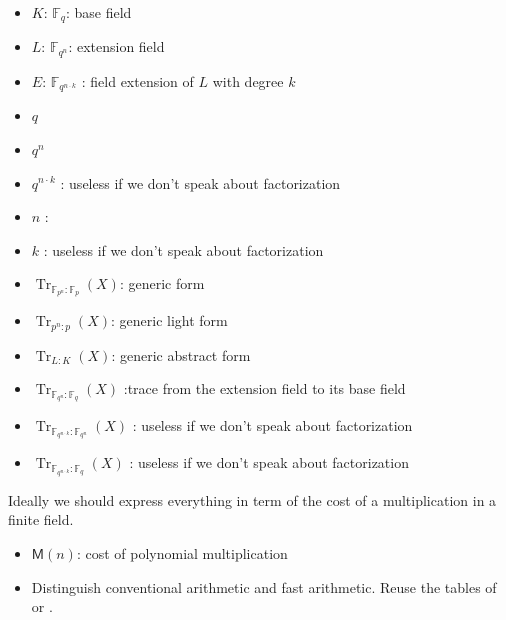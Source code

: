 \documentclass{sig-alternate}
\newcommand{\ff}[1]{\mathbb{F}_{#1}}
\newcommand{\qq}{q}
\newcommand{\nn}{n}
\newcommand{\qn}{{\qq^\nn}}
\newcommand{\extfactfdegree}{k}
\newcommand{\extfactfsize}{\qq^{\nn \cdot \extfactfdegree}}
\newcommand{\basef}{\ff{\qq}}
\newcommand{\extf}{\ff{\qn}}
\newcommand{\extfactf}{\ff{\extfactfsize}}
\DeclareMathOperator{\Tr}{Tr}
\newcommand{\tr}[2]{\Tr_{\ff{#1}:\ff{#2}}}
\newcommand{\trl}[2]{\Tr_{#1:#2}}
\newcommand{\trabs}[2]{\Tr_{#1:#2}}
\newcommand{\trextbase}{\trabs{\extf}{\basef}}
\newcommand{\trextfactext}{\trabs{\extfactf}{\extf}}
\newcommand{\trextfactbase}{\trabs{\extfactf}{\basef}}
\newcommand{\Mul}{\mathsf{M}}
\begin{document}
\medskip


\begin{itemize}
\item $K$: $\basef$: base field
\item $L$:  $\extf$: extension field 
\item $E$: $\extfactf$ : field extension of $L$ with degree $k$  
\item $\qq$
\item $\qn$
\item $\extfactfsize$ : useless if we don't speak about factorization
\item $\nn$ : 
\item $\extfactfdegree$ : useless if we don't speak about factorization

\end{itemize}




\medskip



\begin{itemize}
\item $\tr{p^n}{p}(X)$: generic form
\item $\trl{p^n}{p}(X)$: generic light form
\item $\trabs{L}{K}(X)$: generic abstract form
\item $\trextbase(X)$ :trace from the extension field to its base field 
\item $\trextfactext(X)$ : useless if we don't speak about factorization
\item $\trextfactbase(X)$ : useless if we don't speak about factorization

\end{itemize}



Ideally we should express everything in term of the cost of a multiplication in  a finite field.

\begin{itemize}
\item $\Mul(n)$: cost of polynomial multiplication
\item Distinguish conventional arithmetic and fast arithmetic. Reuse the tables of \cite{KaltofenS97} or \cite{Umans08}.
\end{itemize}
\end{document}
